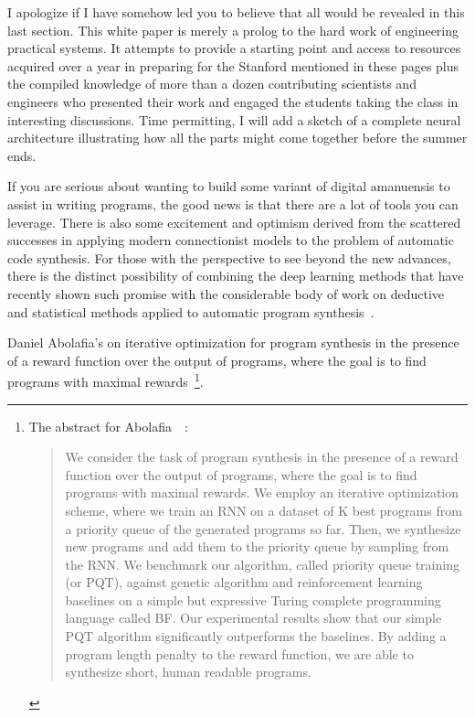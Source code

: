 
I apologize if I have somehow led you to believe that all would be revealed in this last section. This white paper is merely a prolog to the hard work of engineering practical systems. It attempts to provide a starting point and access to resources acquired over a year in preparing for the Stanford {} mentioned in these pages plus the compiled knowledge of more than a dozen contributing scientists and engineers who presented their work and engaged the students taking the class in interesting discussions. Time permitting, I will add a sketch of a complete neural architecture illustrating how all the parts might come together before the summer ends.

If you are serious about wanting to build some variant of digital amanuensis to assist in writing programs, the good news is that there are a lot of tools you can leverage. There is also some excitement and optimism derived from the scattered successes in applying modern connectionist models to the problem of automatic code synthesis. For those with the perspective to see beyond the new advances, there is the distinct possibility of combining the deep learning methods that have recently shown such promise with the considerable body of work on deductive and statistical methods applied to automatic program synthesis~\cite{GulwanietalFaTiPL-17}. 



Daniel Abolafia's {} on iterative optimization for program synthesis in the presence of a reward function over the output of programs, where the goal is to find programs with maximal rewards~\cite{AbolafiaetalCoRR-18}\footnote{%
%
  The abstract for Abolafia~\etal{}~\cite{AbolafiaetalCoRR-18}:
%
  \begin{quotation}
%
    We consider the task of program synthesis in the presence of a reward function over the output of programs, where the goal is to find programs with maximal rewards. We employ an iterative optimization scheme, where we train an RNN on a dataset of K best programs from a priority queue of the generated programs so far. Then, we synthesize new programs and add them to the priority queue by sampling from the RNN. We benchmark our algorithm, called priority queue training (or PQT), against genetic algorithm and reinforcement learning baselines on a simple but expressive Turing complete programming language called BF. Our experimental results show that our simple PQT algorithm significantly outperforms the baselines. By adding a program length penalty to the reward function, we are able to synthesize short, human readable programs.
%
  \end{quotation}}.

